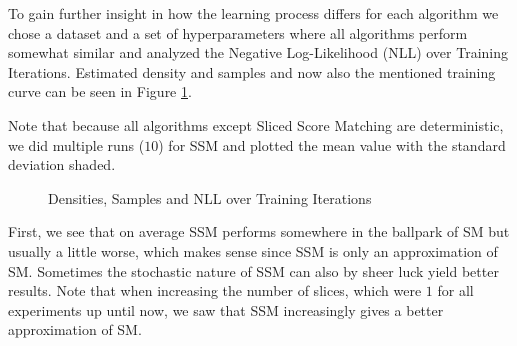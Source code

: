 To gain further insight in how the learning process differs for each algorithm we chose a dataset and a set of hyperparameters
where all algorithms perform somewhat similar and analyzed the Negative Log-Likelihood (NLL) over Training Iterations. 
Estimated density and samples and now also the mentioned training curve can be seen in Figure \ref{fig:halfmoons_10_logp}.

Note that because all algorithms except Sliced Score Matching are deterministic, we did multiple runs ($10$) for SSM and plotted the mean value 
with the standard deviation shaded. 

\begin{figure}[H]
    \centering
    \caption{Densities, Samples and NLL over Training Iterations}
    \label{fig:halfmoons_10_logp}
\end{figure}

First, we see that on average SSM performs somewhere in the ballpark of SM but usually a little worse, which 
makes sense since SSM is only an approximation of SM. Sometimes the stochastic nature of SSM can also 
by sheer luck yield better results. Note that when increasing the number of slices, which were $1$ for all 
experiments up until now, we saw that SSM increasingly gives a better approximation of SM.


